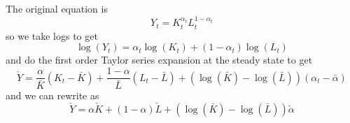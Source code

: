 \documentclass[11pt]{amsart}
\begin{document}
\subsection{}

\subsection{}
The original equation is
\[
Y_t = K_t^{\alpha_t} L_t^{1-\alpha_t}
\]
so we take logs to get
\[
\log(Y_t) = \alpha_t \log(K_t) + (1-\alpha_t) \log(L_t)
\]
and do the first order Taylor series expansion at the steady state to get
\[
\check{Y} =  \frac{\alpha }{\bar{K}} (K_t - \bar{K}) + \frac{1-\alpha }{\bar{L}} (L_t - \bar{L}) + (\log(\bar{K}) - \log(\bar{L})) (\alpha_t - \bar{\alpha})
\]
and we can rewrite as 
\[
\check{Y} = \alpha \check{K} + (1-\alpha) \check{L} + (\log(\bar{K}) - \log(\bar{L})) \check{\alpha}
\]
\end{document}
